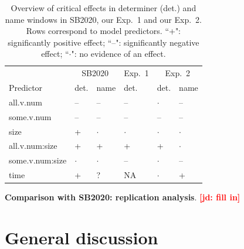 \documentclass[10pt,letterpaper]{article}
\newcommand{\expref}[1]{Exp.~#1}
\newcommand{\jd}[1]{\textcolor{Red}{\textbf{[jd: #1]}}}
\begin{document}
\begin{table}
\caption{Overview of critical effects in determiner (det.) and name windows in SB2020, our \expref{1} and our \expref{2}. Rows correspond to model predictors. ``+": significantly positive effect; ``--": significantly negative effect; ``$\cdot$": no evidence of an effect.}
{\small
\begin{tabular}{l l l l l l }
\toprule
& \multicolumn{2}{c}{SB2020} & \expref{1} & \multicolumn{2}{c}{\expref{2}}\\
Predictor & det. & name & det. & det. & name \\
\midrule
all.v.num & -- &  -- &  -- & $\cdot$ & -- \\
some.v.num & -- &  -- &  -- & -- & -- \\
size & + &  $\cdot$ & $\cdot$ & $\cdot$ & $\cdot$ \\
all.v.num:size & + &  + & + & + & $\cdot$ \\
some.v.num:size & $\cdot$ &  $\cdot$ & -- & $\cdot$ & -- \\
time & + &  ? & NA & $\cdot$ & + \\
\bottomrule
\end{tabular}
}
\label{tab:replication}
\end{table}

\textbf{Comparison with SB2020: replication analysis}. \jd{fill in}

\section{General discussion}
\end{document}

